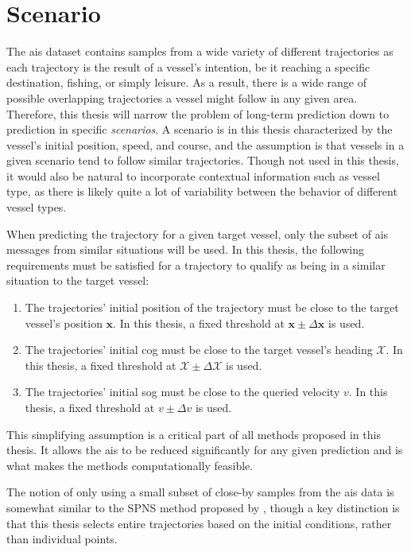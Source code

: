 \section{Scenario}
The \acrshort{ais} dataset contains samples from a wide variety of different trajectories as each trajectory is the result of a vessel's intention, be it reaching a specific destination, fishing, or simply leisure. As a result, there is a wide range of possible overlapping trajectories a vessel might follow in any given area. Therefore, this thesis will narrow the problem of long-term prediction down to prediction in specific \textit{scenarios}. A scenario is in this thesis characterized by the vessel's initial position, speed, and course, and the assumption is that vessels in a given scenario tend to follow similar trajectories. Though not used in this thesis, it would also be natural to incorporate contextual information such as vessel type, as there is likely quite a lot of variability between the behavior of different vessel types. 

When predicting the trajectory for a given target vessel, only the subset of \acrshort{ais} messages from similar situations will be used. In this thesis, the following requirements must be satisfied for a trajectory to qualify as being in a similar situation to the target vessel:
\begin{enumerate}
    \item The trajectories' initial position of the trajectory must be close to the target vessel's position $\boldsymbol{x}$. In this thesis, a fixed threshold at $\boldsymbol{x} \pm \Delta \boldsymbol{x}$ is used.
    \item The trajectories' initial \acrshort{cog} must be close to the target vessel's heading $\mathcal{X}$. In this thesis, a fixed threshold at $\mathcal{X} \pm \Delta \mathcal{X}$ is used.
    \item The trajectories' initial \acrshort{sog} must be close to the queried velocity $v$. In this thesis, a fixed threshold at $v \pm \Delta v$ is used.
\end{enumerate}

This simplifying assumption is a critical part of all methods proposed in this thesis. It allows the \acrshort{ais} to be reduced significantly for any given prediction and is what makes the methods computationally feasible. 

The notion of only using a small subset of close-by samples from the \acrshort{ais} data is somewhat similar to the SPNS method proposed by \cite{Hexeberg2017AISbasedVT}, though a key distinction is that this thesis selects entire trajectories based on the initial conditions, rather than individual points. 

